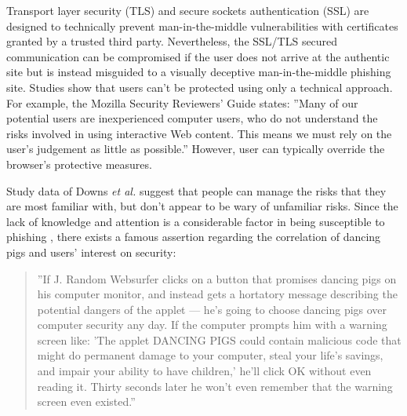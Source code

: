 \documentclass[english,gradu]{tktltiki}
\begin{document}
Transport layer security (TLS) and secure sockets authentication (SSL) are designed to technically prevent man-in-the-middle vulnerabilities with certificates granted by a trusted third party. Nevertheless, the SSL/TLS secured communication can be compromised if the user does not arrive at the authentic site but is instead misguided to a visually deceptive man-in-the-middle phishing site. Studies \cite{why_phishing_works_06, suspectibility_to_phishing_2006} show that users can't be protected using only a technical approach. For example, the Mozilla Security Reviewers' Guide \cite{mozilla_security_guide_2010} states: ''Many of our potential users are inexperienced computer users, who do not understand the risks involved in using interactive Web content. This means we must rely on the user's judgement as little as possible.'' However, user can typically override the browser's protective measures.

Study data of Downs \emph{et al.} \cite{suspectibility_to_phishing_2006} suggest that people can manage the risks that they are most familiar with, but don't appear to be wary of unfamiliar risks. Since the lack of knowledge and attention is a considerable factor in being susceptible to phishing \cite{why_phishing_works_06}, there exists a famous assertion regarding the correlation of dancing pigs and users' interest on security:

            \begin{quote}
              \label{quote:dancing_pigs}
              ''If J. Random Websurfer clicks on a button that promises dancing pigs on his computer monitor, and instead gets a hortatory message describing the potential dangers of the applet — he's going to choose dancing pigs over computer security any day. If the computer prompts him with a warning screen like: 'The applet DANCING PIGS could contain malicious code that might do permanent damage to your computer, steal your life's savings, and impair your ability to have children,' he'll click OK without even reading it. Thirty seconds later he won't even remember that the warning screen even existed.'' \cite{schneier_secrets_and_lies_2000}
            \end{quote}

\end{document}
